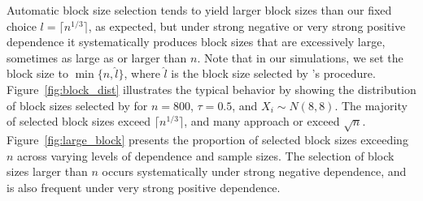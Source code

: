 \documentclass[12pt]{article}
\begin{document}
Automatic block size selection tends to yield larger block sizes than our
fixed choice $l = \lceil n^{1/3} \rceil$, as expected, but under strong
negative or very strong positive dependence it systematically produces
block sizes that are excessively large, sometimes as large as or larger
than $n$. Note that in our simulations, we set the block size to 
$\min \{n, \hat l\}$, where
$\hat l$ is the block size selected by \citet{politis2004automatic}'s
procedure. Figure~\ref{fig:block_dist} illustrates the typical behavior by
showing the distribution of block sizes selected by \citet{politis2004automatic}
for $n = 800$, $\tau = 0.5$, and $X_i \sim N(8,8)$. The majority of selected
block sizes exceed $\lceil n^{1/3} \rceil$, and many approach or exceed
$\sqrt{n}$. Figure~\ref{fig:large_block} presents the proportion of selected
block sizes exceeding $n$ across varying levels of dependence and sample sizes.
The selection of block sizes larger than $n$ occurs systematically under strong
negative dependence, and is also frequent under very strong positive dependence.
\end{document}
